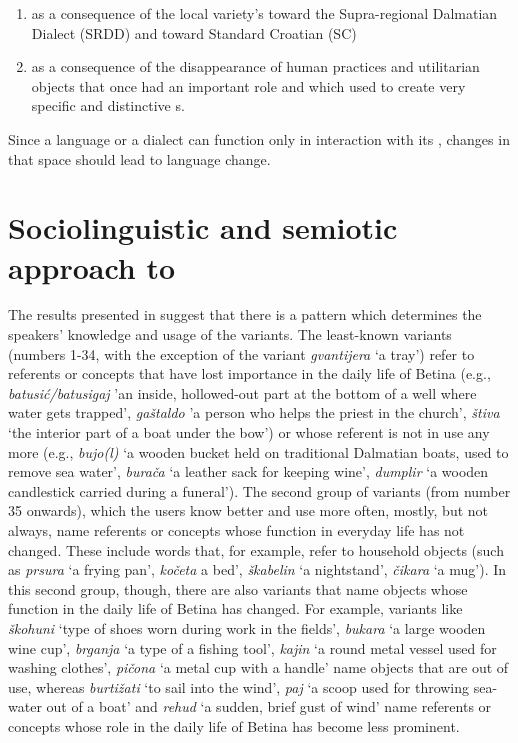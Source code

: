 \documentclass[output=paper]{LSP/langsci}
\begin{document}
\begin{enumerate}
\item as a consequence of the local variety’s  toward the Supra-regional Dalmatian Dialect (SRDD) and toward Standard Croatian (SC)
\item as a consequence of the disappearance of human practices and utilitarian objects that once had an important role and which used to create very specific and distinctive s. 
\end{enumerate}

Since a language or a dialect can function only in interaction with its , changes in that space should lead to language change. 

\section{Sociolinguistic and semiotic approach to }
The results presented in  suggest that there is a pattern which determines the speakers’ knowledge and usage of the variants. The least-known variants (numbers 1-34, with the exception of the variant \textit{gvantijera} ‘a tray’) refer to referents or concepts that have lost importance in the daily life of Betina (e.g., \textit{batusić/batusigaj} 'an inside, hollowed-out part at the bottom of a well where water gets trapped', \textit{gaštaldo} 'a person who helps the priest in the church', \textit{štiva} ‘the interior part of a boat under the bow') or whose referent is not in use any more (e.g., \textit{bujo(l)} ‘a wooden bucket held on traditional Dalmatian boats, used to remove sea water’, \textit{burača} ‘a leather sack for keeping wine’, \textit{dumplir} ‘a wooden candlestick carried during a funeral’). 
The second group of variants (from number 35 onwards), which the users know better and use more often, mostly, but not always, name referents or concepts whose function in everyday life has not changed. These include words that, for example, refer to household objects (such as \textit{prsura} ‘a frying pan’, \textit{kočeta} a bed’, \textit{škabelin} ‘a nightstand’, \textit{čikara} ‘a mug’). In this second group, though, there are also variants that name objects whose function in the daily life of Betina has changed. For example, variants like \textit{škohuni} ‘type of shoes worn during work in the fields’, \textit{bukara} ‘a large wooden wine cup’, \textit{brganja} ‘a type of a fishing tool’, \textit{kajin} ‘a round metal vessel used for washing clothes’, \textit{pičona} ‘a metal cup with a handle’ name objects that are out of use, whereas \textit{burtižati} ‘to sail into the wind’, \textit{paj} ‘a scoop used for throwing sea-water out of a boat’ and \textit{rehud} ‘a sudden, brief gust of wind’ name referents or concepts whose role in the daily life of Betina has become less prominent. 
\end{document}
